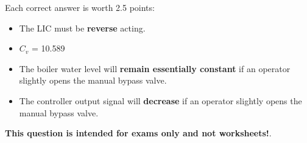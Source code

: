 






Each correct answer is worth 2.5 points:

\begin{itemize}
\item{} The LIC must be {\bf reverse} acting.
\vskip 10pt
\item{} $C_v$ = 10.589
\vskip 10pt
\item{} The boiler water level will {\bf remain essentially constant} if an operator slightly opens the manual bypass valve.
\vskip 10pt
\item{} The controller output signal will {\bf decrease} if an operator slightly opens the manual bypass valve.
\end{itemize}







{\bf This question is intended for exams only and not worksheets!}.


